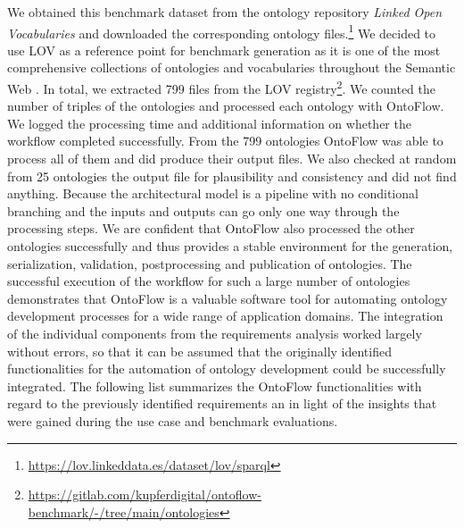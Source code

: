 \documentclass[sigconf]{acmart}
\begin{document}
We obtained this benchmark dataset from the ontology repository \textit{Linked Open Vocabularies} and downloaded the corresponding ontology files.\footnote{\url{https://lov.linkeddata.es/dataset/lov/sparql}} We decided to use LOV as a reference point for benchmark generation as it is one of the most comprehensive collections of ontologies and vocabularies throughout the Semantic Web \cite{lov}. In total, we extracted 799 files from the LOV registry\footnote{\url{https://gitlab.com/kupferdigital/ontoflow-benchmark/-/tree/main/ontologies}}. We counted the number of triples of the ontologies and processed each ontology with OntoFlow. We logged the processing time and additional information on whether the workflow completed successfully. From the 799 ontologies OntoFlow was able to process all of them and did produce their output files. We also checked  at random from 25 ontologies the output file for plausibility and consistency and did not find anything. Because the architectural model is a pipeline with no conditional branching and the inputs and outputs can go only one way through the processing steps. We are confident that OntoFlow also processed the other ontologies successfully and thus provides a stable environment for the generation, serialization, validation, postprocessing and publication of ontologies. The successful execution of the workflow for such a large number of ontologies demonstrates that OntoFlow is a valuable software tool for automating ontology development processes for a wide range of application domains. The integration of the individual components from the requirements analysis worked largely without errors, so that it can be assumed that the originally identified functionalities for the automation of ontology development could be successfully integrated. The following list summarizes the OntoFlow functionalities with regard to the previously identified requirements an in light of the insights that were gained during the use case and benchmark evaluations. 
\end{document}
